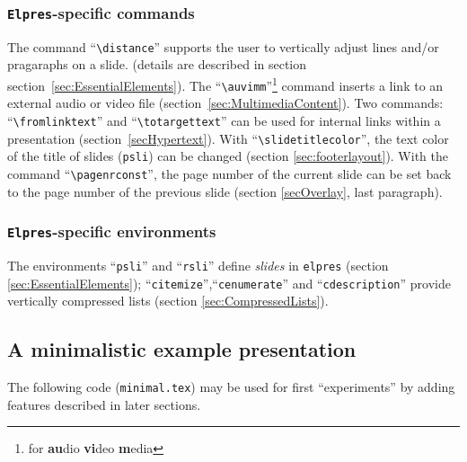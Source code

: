 \documentclass[11pt,a4paper]{article}
\begin{document}
\subsubsection*{\texttt{Elpres}-specific commands}

{ \sloppy
{}
The command
``\verb+\distance+''
supports the user to vertically adjust lines and/or pragaraphs on a 
slide. (details are described in section 
section~\ref{sec:EssentialElements}).
The ``\verb+\auvimm+''\footnote{for \textbf{au}dio \textbf{vi}deo 
  \textbf{m}edia}
command inserts a link to an external audio or video file 
(section~\ref{sec:MultimediaContent}).
Two commands: ``\verb+\fromlinktext+'' and ``\verb+\totargettext+''%
can be used for internal links within a presentation 
(section~\ref{secHypertext}). 
With ``\verb+\slidetitlecolor+'', the text color of the title of slides 
(\texttt{psli}) can be changed (section \ref{sec:footerlayout}).
With the command ``\verb+\pagenrconst+'', the page number of
the current slide can be set back to the page number of the previous slide
(section \ref{secOverlay}, last paragraph). 
\par}

\subsubsection*{\texttt{Elpres}-specific environments}

The environments ``\texttt{psli}'' and ``\texttt{rsli}'' define 
\emph{slides} in \texttt{elpres} (section \ref{sec:EssentialElements}); 
``\texttt{citemize}'',``\texttt{cenumerate}''
 and ``\texttt{cdescription}'' provide vertically compressed lists
(section \ref{sec:CompressedLists}).

\subsection{A minimalistic example presentation}

\label{sec:MiniExample}

The following code (\texttt{minimal.tex})
may be used for first ``experiments'' by adding
features described in later sections.

\end{document}
